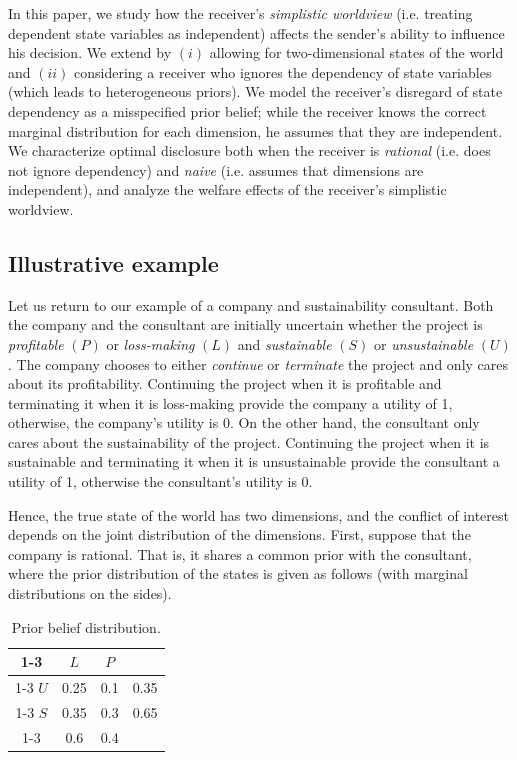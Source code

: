 \documentclass[12pt,english]{article}
\theoremstyle{plain}
\begin{document}
In this paper, we study how the receiver's \emph{simplistic worldview} (i.e. treating dependent state variables as independent) affects the sender's ability to influence his decision. 
We extend \cite{kamenica2011bayesian} by $(i)$ allowing for two-dimensional states of the world and $(ii)$ considering a receiver who ignores the dependency of state variables (which leads to heterogeneous priors). 
We model the receiver's disregard of state dependency as a misspecified prior belief; while the receiver knows the correct marginal distribution for each dimension, he assumes that they are independent. 
We characterize optimal disclosure both when the receiver is \emph{rational} (i.e. does not ignore dependency) and \emph{naive} (i.e. assumes that dimensions are independent), and analyze the welfare effects of the receiver's simplistic worldview.

\subsection{Illustrative example}\label{sec:ex}
Let us return to our example of a company and sustainability consultant. 
Both the company and the consultant are initially uncertain whether the project is \emph{profitable} $(P)$ or \emph{loss-making} $(L)$ and \emph{sustainable} $(S)$ or \emph{unsustainable} $(U)$.
The company chooses to either \emph{continue} or \emph{terminate} the project and only cares about its profitability. 
Continuing the project when it is profitable and terminating it when it is loss-making provide the company a utility of 1, otherwise, the company's utility is 0. 
On the other hand, the consultant only cares about the sustainability of the project.
Continuing the project when it is sustainable and terminating it when it is unsustainable provide the consultant a utility of 1, otherwise the consultant's utility is 0. 

Hence, the true state of the world has two dimensions, and the conflict of interest depends on the joint distribution of the dimensions. 
First, suppose that the company is rational.
That is, it shares a common prior with the consultant, where the prior distribution of the states is given as follows (with marginal distributions on the sides). 
\begin{table}[H]
\begin{centering}
\begin{tabular}{|c|c|c|c}
\cline{1-3} \cline{2-3} \cline{3-3} 
 & $L$ & $P$ & \tabularnewline
\cline{1-3} \cline{2-3} \cline{3-3} 
$U$ & 0.25 & 0.1 & 0.35\tabularnewline
\cline{1-3} \cline{2-3} \cline{3-3} 
$S$ & 0.35 & 0.3 & 0.65 \tabularnewline
\cline{1-3} \cline{2-3} \cline{3-3} 
\multicolumn{1}{c}{} & \multicolumn{1}{c}{0.6} & \multicolumn{1}{c}{0.4} & \tabularnewline
\end{tabular}
\par\end{centering}
\caption{Prior belief distribution.}
\label{tab:ex}
\end{table}
\end{document}
